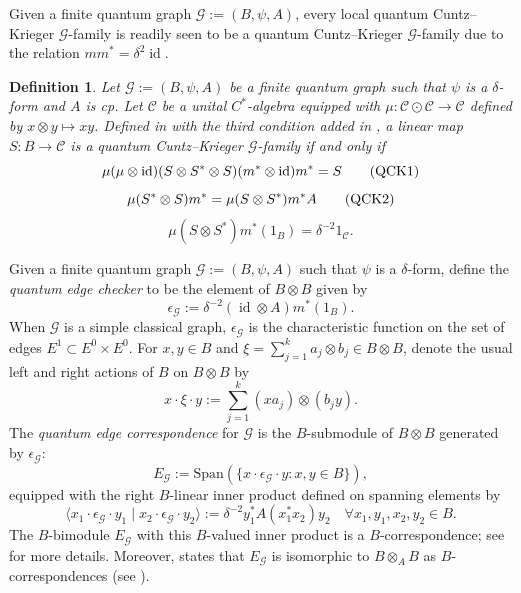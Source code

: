\documentclass[11pt]{article}
\theoremstyle{plain}
\theoremstyle{nonumberplain}
\theoremstyle{plain}
\newtheorem{definition}[lemma]{Definition}
\theoremstyle{nonumberplain}
\DeclareMathOperator{\id}{id}
\newcommand\1{{\bf 1}}
\newcommand\cC{{\mathcal C}}
\newcommand\cG{{\mathcal G}}
\newcommand{\<}{\left\langle}
\renewcommand{\>}{\right\rangle}
\newcommand{\lp}{\left(}
\newcommand{\rp}{\right)}
\newcommand{\spn}[1]{\text{Span}\lp #1\rp} %
\begin{document}

Given a finite quantum graph $\cG:=(B,\psi,A)$, every local quantum Cuntz--Krieger $\cG$-family is readily seen to be a quantum Cuntz--Krieger $\cG$-family due to the relation $m  m^* = \delta^2 \id$.



\begin{definition}\label{def:qck_family}
Let $\cG:=(B,\psi,A)$ be a finite quantum graph such that $\psi$ is a $\delta$-form and $A$ is cp. Let $\cC$ be a unital $C^*$-algebra equipped with $\mu:\cC\odot \cC\to \cC$ defined by $x\otimes y\mapsto xy$. Defined in \cite{BEVW22} with the third condition added in \cite{BHINW23}, a linear map $S:B\to \cC$ is a {\em quantum Cuntz--Krieger $\cG$-family} if and only if
\begin{equation}\label{eq:qck1}
   \mu  (\mu\otimes \id)  (S\otimes S^*\otimes S)  (m^*\otimes \id)
      m^*   =S \tag{\text{QCK1}}
\end{equation}
\vspace{-.5cm}
\begin{equation}\label{eq:qck2}
\mu  (S^*\otimes S)  m^* =  \mu  (S\otimes S^*)  m^*  A\tag{\text{QCK2}}
\end{equation}
\vspace{-.5cm}
\begin{equation}\label{eq:qck3}     \mu  (S\otimes S^*)  m^*(1_B)=\delta^{-2} 1_{\mathcal{C}} \tag{QCK3}.\end{equation} \end{definition}


Given a finite quantum graph $\cG:=(B,\psi,A)$ such that $\psi$ is a $\delta$-form, define the {\em quantum edge checker} to be the element of $B\otimes B$ given by 
\[
\epsilon_{\cG}
:=
\delta^{-2} (\id\otimes A)  m^*(1_B).\]
When $\cG$ is a simple classical graph, $\epsilon_\cG$ is the characteristic function on the set of edges $E^1\subset E^0\times E^0$. For $x,y\in B$ and $\xi = \sum_{j=1}^k a_j\otimes b_j\in B\otimes B$, denote the usual left and right actions of $B$ on $B\otimes B$ by
\[
x\cdot \xi \cdot y := \sum_{j=1}^k (x a_j)\otimes (b_j y).
\]
The {\em quantum edge correspondence} for $\cG$ is the $B$-submodule of $B\otimes B$ generated by $\epsilon_\cG$:
\[
E_{\cG}:= \spn{\{x \cdot \epsilon_\cG \cdot y:x,y\in B\}},
\]
equipped with the right $B$-linear inner product defined on spanning elements by
\[
\langle x_1\cdot \epsilon_\cG\cdot y_1\;|\; x_2\cdot \epsilon_\cG \cdot y_2\rangle
:=
\delta^{-2}y_1^*A(x_1^*x_2)y_2 \quad \forall x_1,y_1,x_2,y_2\in B.
\]
The $B$-bimodule $E_\cG$ with this $B$-valued inner product is a $B$-correspondence; see \cite[Section 2]{BHINW23} for more details. Moreover, \cite[Proposition 2.6]{BHINW23} states that $E_\cG$ is isomorphic to $B\otimes_A B$ as $B$-correspondences (see \cite[Example 1.1, Corollary 2.6]{BHINW23}).
\end{document}
